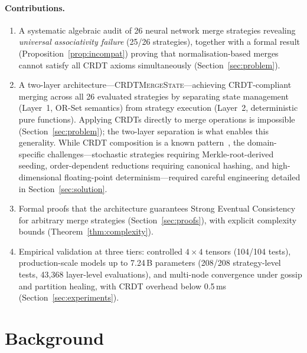 \documentclass[10pt,letterpaper]{article}
\newcommand{\CMS}{\texorpdfstring{{\mdseries\upshape\textsc{CRDTMergeState}}}{CRDTMergeState}}
\begin{document}
\paragraph{Contributions.}
\begin{enumerate}[leftmargin=*]\emergencystretch=1em
\item A systematic algebraic audit of 26 neural network merge strategies revealing \emph{universal associativity failure} (25/26 strategies), together with a formal result (Proposition~\ref{prop:incompat}) proving that normalisation-based merges cannot satisfy all CRDT axioms simultaneously (Section~\ref{sec:problem}).

\item A two-layer architecture---\CMS{}---achieving CRDT-compliant merging across all 26 evaluated strategies by separating state management (Layer~1, OR-Set semantics) from strategy execution (Layer~2, deterministic pure functions).  Applying CRDTs directly to merge operations is impossible (Section~\ref{sec:problem}); the two-layer separation is what enables this generality.  While CRDT composition is a known pattern~\cite{shapiro2011comprehensive}, the domain-specific challenges---stochastic strategies requiring Merkle-root-derived seeding, order-dependent reductions requiring canonical hashing, and high-dimensional floating-point determinism---required careful engineering detailed in Section~\ref{sec:solution}.

\item Formal proofs that the architecture guarantees Strong Eventual Consistency for arbitrary merge strategies (Section~\ref{sec:proofs}), with explicit complexity bounds (Theorem~\ref{thm:complexity}).

\item Empirical validation at three tiers: controlled $4\times 4$ tensors (104/104 tests), production-scale models up to 7.24\,B parameters (208/208 strategy-level tests, 43{,}368 layer-level evaluations), and multi-node convergence under gossip and partition healing, with CRDT overhead below 0.5\,ms (Section~\ref{sec:experiments}).
\end{enumerate}

\section{Background}
\end{document}
